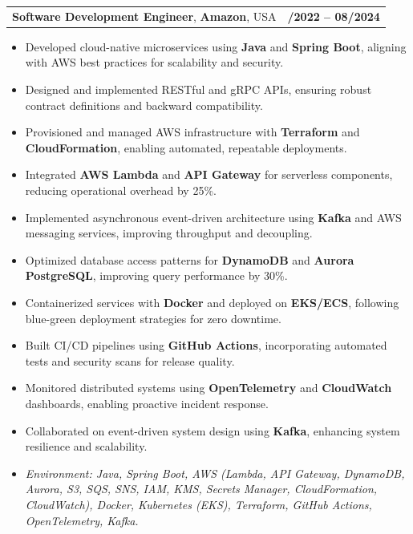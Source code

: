 \documentclass[letterpaper,11pt]{article}
\makeatletter
\newcommand{\resumeItem}[1]{
  \item\footnotesize{
    {#1 \vspace{-2pt}}
  }
}
\newcommand{\resumeSubheading}[4]{
  \vspace{-2pt}\item
    \begin{tabular*}{1.0\textwidth}[t]{l@{\extracolsep{\fill}}r}
      \textbf{\fontsize{10pt}{14pt}\selectfont #3}, \textbf{\fontsize{10pt}{14pt}\selectfont #1}, \fontsize{10pt}{14pt}\selectfont #4 & \textbf{\fontsize{10pt}{14pt}\selectfont #2} \\
    \end{tabular*}\vspace{-7pt}
}
\newcommand{\resumeItemListStart}{\begin{itemize}[leftmargin=*]}
\newcommand{\resumeItemListEnd}{\end{itemize}\vspace{-5pt}}
\makeatother
\begin{document}
\resumeSubheading
{Amazon}{10/2022 -- 08/2024}
{Software Development Engineer}{USA}
\resumeItemListStart
  \resumeItem{Developed cloud-native microservices using \textbf{Java} and \textbf{Spring Boot}, aligning with AWS best practices for scalability and security.}
  \resumeItem{Designed and implemented RESTful and gRPC APIs, ensuring robust contract definitions and backward compatibility.}
  \resumeItem{Provisioned and managed AWS infrastructure with \textbf{Terraform} and \textbf{CloudFormation}, enabling automated, repeatable deployments.}
  \resumeItem{Integrated \textbf{AWS Lambda} and \textbf{API Gateway} for serverless components, reducing operational overhead by 25\%.}
  \resumeItem{Implemented asynchronous event-driven architecture using \textbf{Kafka} and AWS messaging services, improving throughput and decoupling.}
  \resumeItem{Optimized database access patterns for \textbf{DynamoDB} and \textbf{Aurora PostgreSQL}, improving query performance by 30\%.}
  \resumeItem{Containerized services with \textbf{Docker} and deployed on \textbf{EKS/ECS}, following blue-green deployment strategies for zero downtime.}
  \resumeItem{Built CI/CD pipelines using \textbf{GitHub Actions}, incorporating automated tests and security scans for release quality.}
  \resumeItem{Monitored distributed systems using \textbf{OpenTelemetry} and \textbf{CloudWatch} dashboards, enabling proactive incident response.}
  \resumeItem{Collaborated on event-driven system design using \textbf{Kafka}, enhancing system resilience and scalability.}
  \resumeItem{\textit{Environment: Java, Spring Boot, AWS (Lambda, API Gateway, DynamoDB, Aurora, S3, SQS, SNS, IAM, KMS, Secrets Manager, CloudFormation, CloudWatch), Docker, Kubernetes (EKS), Terraform, GitHub Actions, OpenTelemetry, Kafka.}}
\resumeItemListEnd
\end{document}
